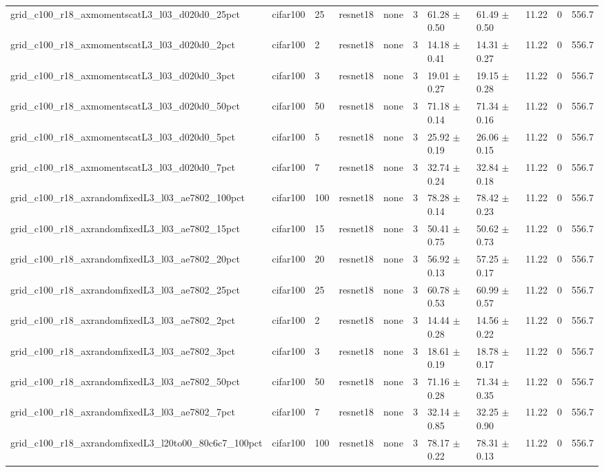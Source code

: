 \begin{tabular}{lllllllllll}
grid_c100_r18_axmomentscatL3_l03_d020d0_25pct & cifar100 & 25 & resnet18 & none & 3 & 61.28 $\pm$ 0.50 & 61.49 $\pm$ 0.50 & 11.22 & 0 & 556.7 \\
grid_c100_r18_axmomentscatL3_l03_d020d0_2pct & cifar100 & 2 & resnet18 & none & 3 & 14.18 $\pm$ 0.41 & 14.31 $\pm$ 0.27 & 11.22 & 0 & 556.7 \\
grid_c100_r18_axmomentscatL3_l03_d020d0_3pct & cifar100 & 3 & resnet18 & none & 3 & 19.01 $\pm$ 0.27 & 19.15 $\pm$ 0.28 & 11.22 & 0 & 556.7 \\
grid_c100_r18_axmomentscatL3_l03_d020d0_50pct & cifar100 & 50 & resnet18 & none & 3 & 71.18 $\pm$ 0.14 & 71.34 $\pm$ 0.16 & 11.22 & 0 & 556.7 \\
grid_c100_r18_axmomentscatL3_l03_d020d0_5pct & cifar100 & 5 & resnet18 & none & 3 & 25.92 $\pm$ 0.19 & 26.06 $\pm$ 0.15 & 11.22 & 0 & 556.7 \\
grid_c100_r18_axmomentscatL3_l03_d020d0_7pct & cifar100 & 7 & resnet18 & none & 3 & 32.74 $\pm$ 0.24 & 32.84 $\pm$ 0.18 & 11.22 & 0 & 556.7 \\
grid_c100_r18_axrandomfixedL3_l03_ae7802_100pct & cifar100 & 100 & resnet18 & none & 3 & 78.28 $\pm$ 0.14 & 78.42 $\pm$ 0.23 & 11.22 & 0 & 556.7 \\
grid_c100_r18_axrandomfixedL3_l03_ae7802_15pct & cifar100 & 15 & resnet18 & none & 3 & 50.41 $\pm$ 0.75 & 50.62 $\pm$ 0.73 & 11.22 & 0 & 556.7 \\
grid_c100_r18_axrandomfixedL3_l03_ae7802_20pct & cifar100 & 20 & resnet18 & none & 3 & 56.92 $\pm$ 0.13 & 57.25 $\pm$ 0.17 & 11.22 & 0 & 556.7 \\
grid_c100_r18_axrandomfixedL3_l03_ae7802_25pct & cifar100 & 25 & resnet18 & none & 3 & 60.78 $\pm$ 0.53 & 60.99 $\pm$ 0.57 & 11.22 & 0 & 556.7 \\
grid_c100_r18_axrandomfixedL3_l03_ae7802_2pct & cifar100 & 2 & resnet18 & none & 3 & 14.44 $\pm$ 0.28 & 14.56 $\pm$ 0.22 & 11.22 & 0 & 556.7 \\
grid_c100_r18_axrandomfixedL3_l03_ae7802_3pct & cifar100 & 3 & resnet18 & none & 3 & 18.61 $\pm$ 0.19 & 18.78 $\pm$ 0.17 & 11.22 & 0 & 556.7 \\
grid_c100_r18_axrandomfixedL3_l03_ae7802_50pct & cifar100 & 50 & resnet18 & none & 3 & 71.16 $\pm$ 0.28 & 71.34 $\pm$ 0.35 & 11.22 & 0 & 556.7 \\
grid_c100_r18_axrandomfixedL3_l03_ae7802_7pct & cifar100 & 7 & resnet18 & none & 3 & 32.14 $\pm$ 0.85 & 32.25 $\pm$ 0.90 & 11.22 & 0 & 556.7 \\
grid_c100_r18_axrandomfixedL3_l20to00_80c6c7_100pct & cifar100 & 100 & resnet18 & none & 3 & 78.17 $\pm$ 0.22 & 78.31 $\pm$ 0.13 & 11.22 & 0 & 556.7 \\

\end{tabular}
